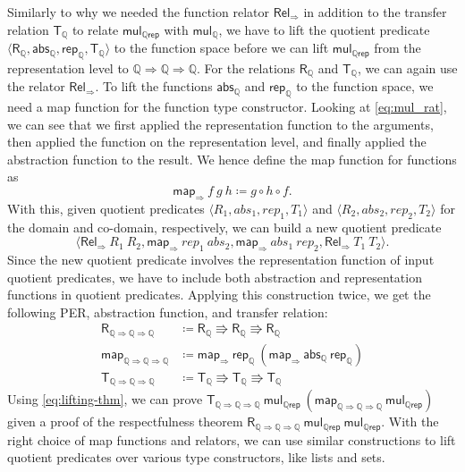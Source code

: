 \documentclass{article}
\theoremstyle{definition}
\newcommand{\mapfun}{\mathsf{map_\Rightarrow}}
\newcommand{\relfun}{\mathsf{Rel_\Rightarrow}}
\newcommand{\rel}{\mathsf{Rel}}
\newcommand{\rat}{\mathbb{Q}}
\newcommand{\abs}{\mathsf{abs}}
\newcommand{\rep}{\mathsf{rep}}
\begin{document}
Similarly to why we needed the function relator \(\rel_\Rightarrow\) in addition to the transfer relation \(\mathsf{T_\rat}\) to relate \(\mathsf{mul_{\rat rep}}\) with \(\mathsf{mul_\rat}\),
we have to lift the quotient predicate \(\langle \mathsf{R_\rat}, \abs_\rat, \rep_\rat, \mathsf{T_\rat} \rangle\) to the function space before we can lift \(\mathsf{mul_{\rat rep}}\) from the representation level to \(\rat \Rightarrow \rat \Rightarrow \rat\).
For the relations \(\mathsf{R_\rat}\) and \(\mathsf{T_\rat}\),
we can again use the relator \(\rel_\Rightarrow\).
To lift the functions \(\abs_\rat\) and \(\rep_\rat\) to the function space, we need a map function for the function type constructor.
Looking at \cref{eq:mul_rat},
we can see that we first applied the representation function to the arguments,
then applied the function on the representation level,
and finally applied the abstraction function to the result.
We hence define the map function for functions as
\begin{equation*}
	\mapfun\ f\ g\ h \coloneqq g \circ h \circ f.
\end{equation*}
With this, given quotient predicates \(\langle R_1, abs_1, rep_1, T_1 \rangle\) and \(\langle R_2, abs_2, rep_2, T_2 \rangle\) for the domain and co-domain, respectively,
we can build a new quotient predicate
\begin{equation}
	\langle \relfun\ R_1\ R_2, \mapfun\ rep_1\ abs_2, \mapfun\ abs_1\ rep_2, \relfun\ T_1\ T_2 \rangle\label{eq:fun-quot-pred}.
\end{equation}
Since the new quotient predicate involves the representation function of input quotient predicates,
we have to include both abstraction and representation functions in quotient predicates.
Applying this construction twice, we get the following PER, abstraction function,
and transfer relation:
\begin{align*}
	\mathsf{R}_{\rat \Rightarrow\rat \Rightarrow\rat} &\coloneqq \mathsf{R_\rat} \Rrightarrow \mathsf{R_\rat} \Rrightarrow \mathsf{R_\rat} \\
	\mathsf{map}_{\rat \Rightarrow\rat \Rightarrow\rat} &\coloneqq \mapfun\ \rep_\rat\ (\mapfun\ \abs_\rat\ \rep_\rat) \\
	\mathsf{T}_{\rat \Rightarrow\rat \Rightarrow\rat} &\coloneqq \mathsf{T_\rat} \Rrightarrow \mathsf{T_\rat} \Rrightarrow \mathsf{T_\rat}
\end{align*}
Using \cref{eq:lifting-thm},
we can prove \(\mathsf{T}_{\rat \Rightarrow\rat \Rightarrow\rat}\ \mathsf{mul_{\rat rep}}\ (\mathsf{map}_{\rat \Rightarrow\rat \Rightarrow\rat}\ \mathsf{mul_{\rat rep}})\) given a proof
of the respectfulness theorem \(\mathsf{R}_{\rat \Rightarrow\rat \Rightarrow\rat}\ \mathsf{mul_{\rat rep}}\ \mathsf{mul_{\rat rep}}\).
With the right choice of map functions and relators, we can use similar constructions to lift quotient predicates over various type constructors, like lists and sets.
\end{document}

